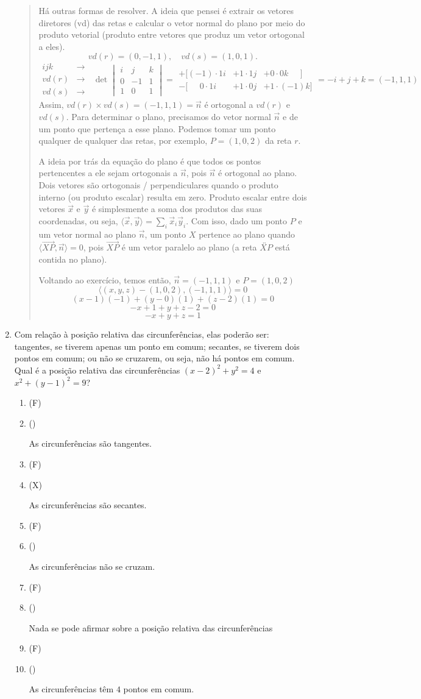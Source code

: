 \documentclass[12pt,a4paper]{article}
\newenvironment{ans}{\color{blue}\begin{quote}}{\end{quote}}
\newif \ifans
\newif \ifvf
\newcommand{\alt}{
	\ifvf
		\ifans
			\item({\sf\color{ForestGreen}V})
		\else 
			\item({\sf\color{Orange}F}) 
		\fi
	\else
		\ifans
			\item({\sf\color{Cyan}X})
		\else 
			\item({\sf\phantom{X}}) 
		\fi	
	\fi	
	\ansfalse
	\vffalse
}
\def\X{\anstrue}
\begin{document}
\begin{enumerate}
	\begin{ans}
	Há outras formas de resolver. A ideia que pensei é extrair os vetores diretores (vd) das retas e calcular o vetor normal do plano por meio do produto vetorial (produto entre vetores que produz um vetor ortogonal a eles). 
	\[
	vd(r) = (0,-1,1), \quad vd(s) = (1,0,1).
	\]
	\[
	\begin{matrix}
	ijk&\to\\
	vd(r)&\to\\
	vd(s)&\to
	\end{matrix}\;\;
	\det
	\begin{vmatrix}
	i & j & k\\
	0 & -1 & 1\\
	1 & 0 & 1
	\end{vmatrix}
	=
	\begin{matrix}
	+\Big[(-1)\cdot 1i  & +1\cdot 1j & + 0\cdot 0k\;\;\;\;\;\Big]\\
	-\Big[\;\;\;\;\;0\cdot 1i  & +1\cdot 0j & + 1\cdot(-1)k\Big]
	\end{matrix}
	=-i+j+k=(-1,1,1)
	\]
	Assim, $vd(r)\times vd(s)=(-1,1,1)=\vec n$ é ortogonal a $vd(r)$ e $vd(s)$.  Para determinar o plano, precisamos do vetor normal $\vec n$ e de um ponto que pertença a esse plano. Podemos tomar um ponto qualquer de qualquer das retas, por exemplo, $P=(1,0,2)$ da reta $r$.

	A ideia por trás da equação do plano é que todos os pontos pertencentes a ele sejam ortogonais a $\vec n$, pois $\vec n$ é ortogonal ao plano. Dois vetores são ortogonais / perpendiculares quando o produto interno (ou produto escalar) resulta em zero. Produto escalar entre dois vetores $\vec x$ e $\vec y$ é simplesmente a soma dos produtos das suas coordenadas, ou seja, $\langle \vec x,\vec y\rangle = \sum_i \vec x_i\vec y_i$. Com isso, dado um ponto $P$ e um vetor normal ao plano $\vec n$, um ponto $X$ pertence ao plano quando $\langle\overrightarrow{XP},\vec n\rangle=0$, pois $\overrightarrow{XP}$ é um vetor paralelo ao plano (a reta $\overleftrightarrow{XP}$ está contida no plano).
	
	Voltando ao exercício, temos então, $\vec n=(-1,1,1)$ e $P=(1,0,2)$
	\[
	\big\langle (x,y,z)-(1,0,2), (-1,1,1)\big\rangle=0
	\]
	\[
	(x-1)(-1) + (y-0)(1)+(z-2)(1)=0
	\]
	\[
	-x+1+y+z-2=0
	\]
	\[
	-x+y+z=1 
	\]
	\end{ans}






\item Com relação à posição relativa das circunferências, elas poderão ser: tangentes, se tiverem apenas um ponto em comum; secantes, se tiverem dois pontos em comum; ou não se cruzarem, ou seja, não há pontos em comum. Qual é a posição relativa das circunferências $(x-2)^2+y^2=4$ e $x^2+(y-1)^2=9$?
	\begin{enumerate}
	\alt As circunferências são tangentes.
	\X\alt As circunferências são secantes.
	\alt As circunferências não se cruzam.
	\alt Nada se pode afirmar sobre a posição relativa das circunferências
	\alt As circunferências têm $4$ pontos em comum.
	\end{enumerate}
	

\end{enumerate}
\end{document}
